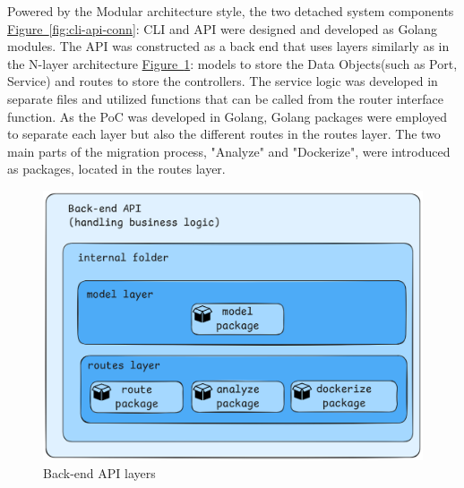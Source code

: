 \documentclass[twocolumn]{article}
\newcommand{\FigRef}[1]{\hyperref[#1]{Figure~\ref{#1}}}
\begin{document}
Powered by the Modular architecture style, the two detached system components \FigRef{fig:cli-api-conn}: CLI and API were designed and developed as Golang modules. The API was constructed as a back end that uses layers similarly as in the N-layer architecture \FigRef{fig:back-end-api-layers}: models to store the Data Objects(such as Port, Service) and routes to store the controllers. The service logic was developed in separate files and utilized functions that can be called from the router interface function. As the PoC was developed in Golang, Golang packages were employed to separate each layer but also the different routes in the routes layer. The two main parts of the migration process, "Analyze" and "Dockerize", were introduced as packages, located in the routes layer.

\begin{figure}[H]
    \centering
    \includegraphics[width=\linewidth]{images/back-end-api-layers.png}
    \caption{Back-end API layers}
    \label{fig:back-end-api-layers}
\end{figure}
\end{document}

